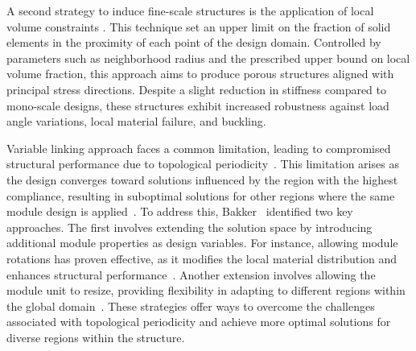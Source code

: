 A second strategy to induce fine-scale structures is the application of local volume constraints . This technique set an upper limit on the fraction of solid elements in the proximity of each point of the design domain. Controlled by parameters such as neighborhood radius and the prescribed upper bound on local volume fraction, this approach aims to produce porous structures aligned with principal stress directions. Despite a slight reduction in stiffness compared to mono-scale designs, these structures exhibit increased robustness against load angle variations, local material failure, and buckling.

Variable linking approach faces a common limitation, leading to compromised structural performance due to topological periodicity~. This limitation arises as the design converges toward solutions influenced by the region with the highest compliance, resulting in suboptimal solutions for other regions where the same module design is applied~. To address this, Bakker~ identified two key approaches. The first involves extending the solution space by introducing additional module properties as design variables. For instance, allowing module rotations has proven effective, as it modifies the local material distribution and enhances structural performance~. Another extension involves allowing the module unit to resize, providing flexibility in adapting to different regions within the global domain~. These strategies offer ways to overcome the challenges associated with topological periodicity and achieve more optimal solutions for diverse regions within the structure.